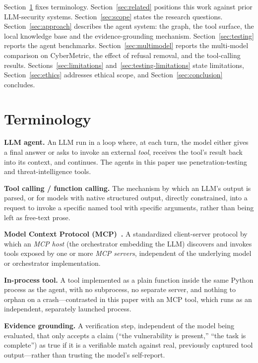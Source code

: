 \documentclass[conference]{IEEEtran}
\begin{document}
Section~\ref{sec:terminology} fixes terminology. Section~\ref{sec:related}
positions this work against prior LLM-security systems. Section~\ref{sec:scope}
states the research questions. Section~\ref{sec:approach} describes the
agent system: the graph, the tool surface, the local knowledge base and the
evidence-grounding mechanism. Section~\ref{sec:testing} reports the agent
benchmarks. Section~\ref{sec:multimodel} reports the multi-model comparison
on CyberMetric, the effect of refusal removal, and the tool-calling
results. Sections~\ref{sec:limitations} and~\ref{sec:testing-limitations}
state limitations, Section~\ref{sec:ethics} addresses ethical scope, and
Section~\ref{sec:conclusion} concludes.

\section{Terminology}
\label{sec:terminology}

\textbf{LLM agent.} An LLM run in a loop where, at each turn, the model
either gives a final answer or asks to invoke an external \emph{tool},
receives the tool's result back into its context, and continues. The
agents in this paper use penetration-testing and threat-intelligence tools.

\textbf{Tool calling / function calling.} The mechanism by which an LLM's
output is parsed, or for models with native structured output, directly
constrained, into a request to invoke a specific named tool with specific
arguments, rather than being left as free-text prose.

\textbf{Model Context Protocol (MCP)~\cite{mcp-spec}.} A standardized
client-server protocol by which an \emph{MCP host} (the orchestrator
embedding the LLM) discovers and invokes tools exposed by one or more
\emph{MCP servers}, independent of the underlying model or orchestrator
implementation.

\textbf{In-process tool.} A tool implemented as a plain function inside the
same Python process as the agent, with no subprocess, no separate server,
and nothing to orphan on a crash---contrasted in this paper with an MCP
tool, which runs as an independent, separately launched process.

\textbf{Evidence grounding.} A verification step, independent of the model
being evaluated, that only accepts a claim (``the vulnerability is
present,'' ``the task is complete'') as true if it is a verifiable match
against real, previously captured tool output---rather than trusting the
model's self-report.
\end{document}
